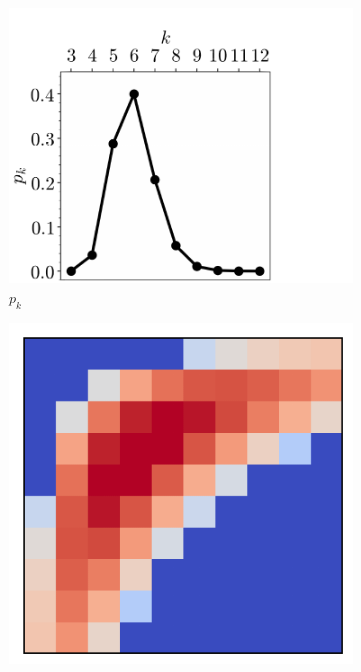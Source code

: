 \begin{figure}[bt]
     \centering
       
     \begin{subfigure}[b]{0.32\textwidth}
         \centering
         \includegraphics[width=\textwidth]{./figures/general_networks/assort_mat_pk.pdf}
         \caption{$p_k$}
         \label{fig:rexa}
     \end{subfigure}
     \hfill
     \begin{subfigure}[b]{0.205\textwidth}
         \centering
         \includegraphics[width=\textwidth]{./figures/general_networks/assort_mat_-75.pdf}

\end{subfigure}
\end{figure}
